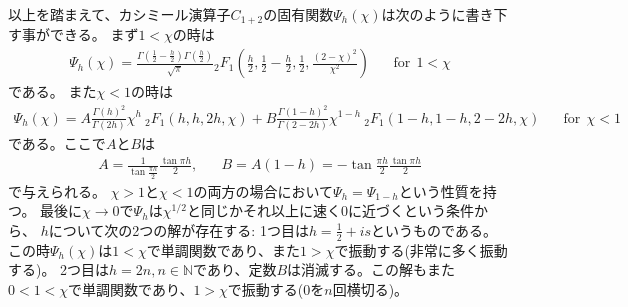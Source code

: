 以上を踏まえて、カシミール演算子$C_{1+2}$の固有関数$\Psi_h(\chi)$は次のように書き下す事ができる。
まず$1 < \chi$の時は
\begin{align}
	\Psi_h(\chi)
	= \frac{\Gamma\left(\frac{1}{2} - \frac{h}{2}\right)\Gamma\left(\frac{h}{2}\right)}
		{\sqrt{\pi}}
	{}_2F_1\left(\frac{h}{2},\frac{1}{2} - \frac{h}{2},\frac{1}{2},
	\frac{(2 - \chi)^2}{\chi^2}\right)
	\hspace{20pt}\mathrm{for\ \ }1 < \chi
	\label{eq:Psi_h_for_chi>1}
\end{align}
である。
また$\chi < 1$の時は
\begin{align}
	\Psi_h(\chi)
	= A\frac{\Gamma(h)^2}{\Gamma(2h)}\chi^h\ {}_2F_1(h, h, 2h, \chi)
	+ B\frac{\Gamma(1-h)^2}{\Gamma(2 - 2h)}\chi^{1-h}\ {}_2F_1(1-h, 1-h, 2-2h, \chi)
	\hspace{20pt}\mathrm{for\ \ }\chi < 1
	\label{eq:Psi_h_for_chi<1}
\end{align}
である。ここで$A$と$B$は
\begin{align}
	A = \frac{1}{\tan\frac{\pi h}{2}}\frac{\tan\pi h}{2},\hspace{20pt}
	B = A(1 - h) = -\tan\frac{\pi h}{2}\frac{\tan\pi h}{2}
\end{align}
で与えられる。
$\chi > 1$と$\chi < 1$の両方の場合において$\Psi_h = \Psi_{1-h}$という性質を持つ。
最後に$\chi \to 0$で$\Psi_h$は$\chi^{1/2}$と同じかそれ以上に速く0に近づくという条件から、
$h$について次の2つの解が存在する:
1つ目は$h = \frac{1}{2} + is$というものである。
この時$\Psi_h(\chi)$は$1 < \chi$で単調関数であり、また$1 > \chi$で振動する(非常に多く振動する)。
2つ目は$h = 2n, n \in \mathbb{N}$であり、定数$B$は消滅する。この解もまた
$0 < 1 < \chi$で単調関数であり、$1 > \chi$で振動する(0を$n$回横切る)。

